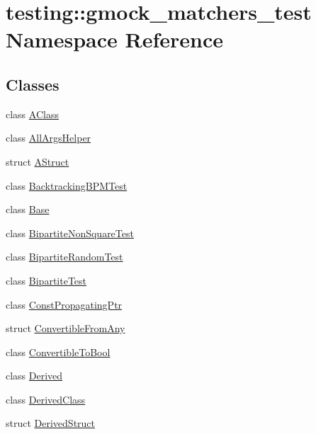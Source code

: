 \hypertarget{namespacetesting_1_1gmock__matchers__test}{}\section{testing\+:\+:gmock\+\_\+matchers\+\_\+test Namespace Reference}
\label{namespacetesting_1_1gmock__matchers__test}
\subsection*{Classes}
\begin{DoxyCompactItemize}
\item 
class \hyperlink{classtesting_1_1gmock__matchers__test_1_1_a_class}{A\+Class}
\item 
class \hyperlink{classtesting_1_1gmock__matchers__test_1_1_all_args_helper}{All\+Args\+Helper}
\item 
struct \hyperlink{structtesting_1_1gmock__matchers__test_1_1_a_struct}{A\+Struct}
\item 
class \hyperlink{classtesting_1_1gmock__matchers__test_1_1_backtracking_b_p_m_test}{Backtracking\+B\+P\+M\+Test}
\item 
class \hyperlink{classtesting_1_1gmock__matchers__test_1_1_base}{Base}
\item 
class \hyperlink{classtesting_1_1gmock__matchers__test_1_1_bipartite_non_square_test}{Bipartite\+Non\+Square\+Test}
\item 
class \hyperlink{classtesting_1_1gmock__matchers__test_1_1_bipartite_random_test}{Bipartite\+Random\+Test}
\item 
class \hyperlink{classtesting_1_1gmock__matchers__test_1_1_bipartite_test}{Bipartite\+Test}
\item 
class \hyperlink{classtesting_1_1gmock__matchers__test_1_1_const_propagating_ptr}{Const\+Propagating\+Ptr}
\item 
struct \hyperlink{structtesting_1_1gmock__matchers__test_1_1_convertible_from_any}{Convertible\+From\+Any}
\item 
class \hyperlink{classtesting_1_1gmock__matchers__test_1_1_convertible_to_bool}{Convertible\+To\+Bool}
\item 
class \hyperlink{classtesting_1_1gmock__matchers__test_1_1_derived}{Derived}
\item 
class \hyperlink{classtesting_1_1gmock__matchers__test_1_1_derived_class}{Derived\+Class}
\item 
struct \hyperlink{structtesting_1_1gmock__matchers__test_1_1_derived_struct}{Derived\+Struct}

\end{DoxyCompactItemize}
